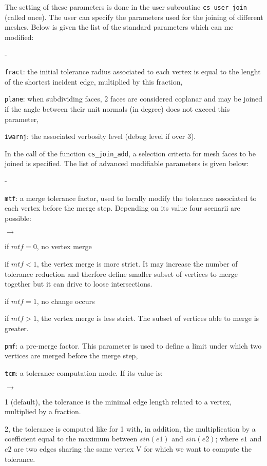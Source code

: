 {{{The setting of these parameters is done in the user subroutine \texttt{cs\_user\_join} (called once). The user can specify the parameters used for the joining of different meshes. Below is given the list of the standard parameters which can me modified:
\begin{list}{-}{}
\item \texttt{fract}: the initial tolerance radius associated to each vertex is equal to the lenght of the shortest incident edge, multiplied by this fraction,
\item \texttt{plane}: when subdividing faces, 2 faces are considered coplanar and may be joined if the angle between their unit normals (in degree) does not exceed this parameter,
\item \texttt{iwarnj}: the associated verbosity level (debug level if over 3).
\end{list}
In the call of the function \texttt{cs\_join\_add}, a selection criteria for
mesh faces to be joined is specified.
The list of advanced modifiable parameters is given below:
\begin{list}{-}{}
\item \texttt{mtf}: a merge tolerance factor, used to locally modify the tolerance associated to each vertex before the merge step. Depending on its value four scenarii are possible:
\begin{list}{$\rightarrow$}{}
\item if $mtf=0$, no vertex merge
\item if $mtf<1$, the vertex merge is more strict. It may increase the number of tolerance reduction and therfore define smaller subset of vertices to merge together but it can drive to loose intersections.
\item if $mtf=1$, no change occurs
\item if $mtf>1$, the vertex merge is less strict. The subset of vertices able to merge is greater.
\end{list}
\item \texttt{pmf}: a pre-merge factor. This parameter is used to define a limit under which two vertices are merged before the merge step,
\item \texttt{tcm}: a tolerance computation mode. If its value is:
\begin{list}{$\rightarrow$}{}
\item 1 (default), the tolerance is the minimal edge length related to a vertex, multiplied by a fraction.
\item 2, the tolerance is computed like for 1 with, in addition, the multiplication by a coefficient equal to the maximum between $sin(e1)$ and $sin(e2)$; where $e1$ and $e2$ are two edges sharing the same vertex V for which we want to compute the tolerance.

\end{list}
\end{list}}}}
